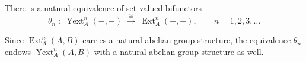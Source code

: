There is a natural equivalence of set-valued bifunctors
$$
\theta_n \;:\; \operatorname{Yext}_A^n(-,-) \;\xrightarrow{\;\cong\;}\; \operatorname{Ext}_A^n(-,-), \qquad n = 1, 2, 3, \dots
$$

Since $\operatorname{Ext}_A^n(A,B)$ carries a natural abelian group structure, the equivalence $\theta_n$ endows $\operatorname{Yext}_A^n(A,B)$ with a natural abelian group structure as well.
